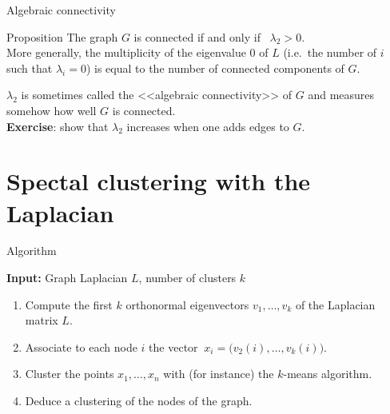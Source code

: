 \documentclass{beamer}
\begin{document}
\begin{frame}[t]{Algebraic connectivity}
	\grid

	\begin{block}{Proposition}
		The graph $G$ is connected if and only if \ $\lambda_2 > 0$.
		\\
		More generally, the multiplicity of the eigenvalue $0$ of $L$ (i.e.\ the number of $i$ such that $\lambda_i = 0$) is equal to the number of connected components of $G$.
\end{block}

\vspace{0.5cm}
$\lambda_2$ is sometimes called the <<algebraic connectivity>> of $G$ and measures somehow how well $G$ is connected.
\\

\vspace{0.5cm}
\textbf{Exercise}: show that $\lambda_2$ increases when one adds edges to $G$.
\end{frame}

\section{Spectal clustering with the Laplacian}

\begin{frame}[t]{Algorithm}
	\grid

	\vspace{-0.2cm}
	\textbf{Input:} Graph Laplacian $L$, number of clusters $k$
	\begin{enumerate}
		\item Compute the first $k$ orthonormal eigenvectors $v_1, \dots, v_k$ of the Laplacian matrix $L$.
			\vspace{0.1cm}
		\item Associate to each node $i$ the vector $\ x_i = \big(v_{2}(i), \dots, v_k(i) \big)$.
			\vspace{0.1cm}
		\item Cluster the points $x_1, \dots, x_n$ with (for instance) the $k$-means algorithm.
			\vspace{0.1cm}
		\item Deduce a clustering of the nodes of the graph.
	\end{enumerate}

\end{frame}
\end{document}
